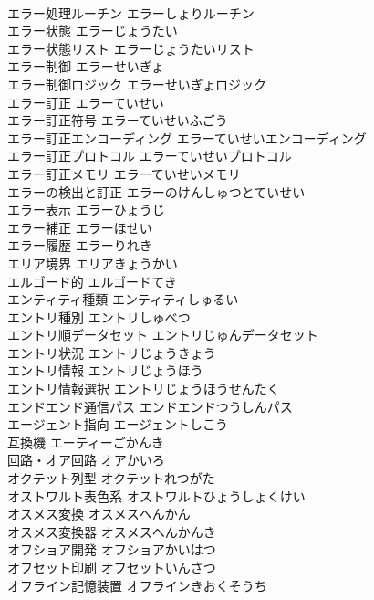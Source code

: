 \documentclass[8pt]{extreport}
\begin{document}
\begin{CJK}{UTF8}{min}
\\	エラー処理ルーチン	エラーしょりルーチン	
\\	エラー状態	エラーじょうたい	
\\	エラー状態リスト	エラーじょうたいリスト	
\\	エラー制御	エラーせいぎょ	
\\	エラー制御ロジック	エラーせいぎょロジック	
\\	エラー訂正	エラーていせい	
\\	エラー訂正符号	エラーていせいふごう	
\\	エラー訂正エンコーディング	エラーていせいエンコーディング	
\\	エラー訂正プロトコル	エラーていせいプロトコル	
\\	エラー訂正メモリ	エラーていせいメモリ	
\\	エラーの検出と訂正	エラーのけんしゅつとていせい	
\\	エラー表示	エラーひょうじ	
\\	エラー補正	エラーほせい	
\\	エラー履歴	エラーりれき	
\\	エリア境界	エリアきょうかい	
\\	エルゴード的	エルゴードてき	
\\	エンティティ種類	エンティティしゅるい	
\\	エントリ種別	エントリしゅべつ	
\\	エントリ順データセット	エントリじゅんデータセット	
\\	エントリ状況	エントリじょうきょう	
\\	エントリ情報	エントリじょうほう	
\\	エントリ情報選択	エントリじょうほうせんたく	
\\	エンドエンド通信パス	エンドエンドつうしんパス	
\\	エージェント指向	エージェントしこう	
\\	互換機	エーティーごかんき	
\\	回路・オア回路	オアかいろ	
\\	オクテット列型	オクテットれつがた	
\\	オストワルト表色系	オストワルトひょうしょくけい	
\\	オスメス変換	オスメスへんかん	
\\	オスメス変換器	オスメスへんかんき	
\\	オフショア開発	オフショアかいはつ	
\\	オフセット印刷	オフセットいんさつ	
\\	オフライン記憶装置	オフラインきおくそうち	

\end{CJK}
\end{document}
